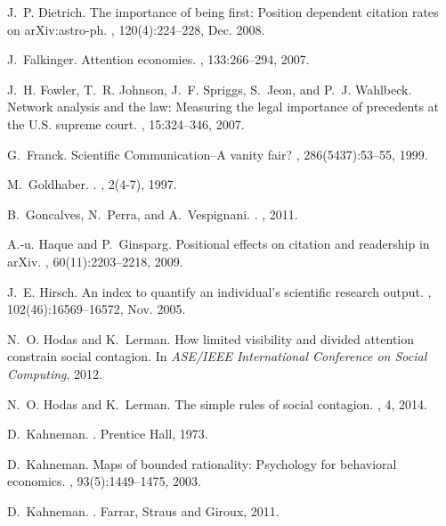 \documentclass[10pt]{bmc_article}
\begin{document}
\begin{thebibliography}{10}
J.~P. Dietrich.
\newblock The importance of being first: Position dependent citation rates on
  {arXiv}:astro-ph.
,
  120(4):224--228, Dec. 2008.

J.~Falkinger.
\newblock Attention economies.
, 133:266--294, 2007.

J.~H. Fowler, T.~R. Johnson, J.~F. Spriggs, S.~Jeon, and P.~J. Wahlbeck.
\newblock Network analysis and the law: Measuring the legal importance of
  precedents at the {U.S}. supreme court.
, 15:324--346, 2007.

G.~Franck.
\newblock Scientific {Communication--A} vanity fair?
, 286(5437):53--55, 1999.

M.~Goldhaber.
.
, 2(4-7), 1997.

B.~Goncalves, N.~Perra, and A.~Vespignani.
.
, 2011.

A.-u. Haque and P.~Ginsparg.
\newblock Positional effects on citation and readership in {arXiv}.
, 60(11):2203--2218, 2009.

J.~E. Hirsch.
\newblock An index to quantify an individual's scientific research output.
, 102(46):16569--16572, Nov. 2005.

N.~O. Hodas and K.~Lerman.
\newblock How limited visibility and divided attention constrain social
  contagion.
\newblock In {\em ASE/IEEE International Conference on Social Computing}, 2012.

N.~O. Hodas and K.~Lerman.
\newblock The simple rules of social contagion.
, 4, 2014.

D.~Kahneman.
.
\newblock Prentice Hall, 1973.

D.~Kahneman.
\newblock Maps of bounded rationality: Psychology for behavioral economics.
, 93(5):1449--1475, 2003.

D.~Kahneman.
.
\newblock Farrar, Straus and Giroux, 2011.


\end{thebibliography}
\end{document}
